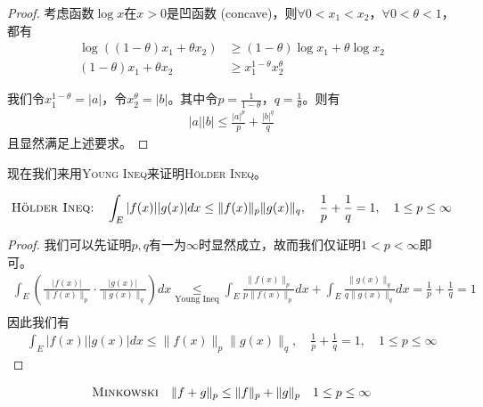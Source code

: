 \begin{proof}
    考虑函数$\log x$在$x>0$是凹函数 (concave)，则$\forall 0<x_1<x_2$，$\forall 0<\theta<1$，都有
    \begin{align*}
        \log\left( (1-\theta)x_1 + \theta x_2\right) &\ge (1-\theta) \log x_1 + \theta \log x_2\\
        (1-\theta)x_1 + \theta x_2 &\ge x_1^{1-\theta} x_2^{\theta} 
    \end{align*}

    我们令$x_1^{1-\theta} = |a|$，令$x_2^{\theta} = |b|$。其中令$p=\frac{1}{1-\theta}$，$q = \frac{1}{\theta}$。则有
    \begin{align*}
        |a||b|\le \frac{|a|^p}{p} + \frac{|b|^q}{q}
    \end{align*}
    且显然满足上述要求。
\end{proof}

现在我们来用\textsc{Young Ineq}来证明\textsc{Hölder Ineq}。
\begin{theorem}
    \begin{align*}
        \textsc{Hölder Ineq:}\quad \int_E |f(x)| |g(x)| dx\le \|f(x)\|_p\|g(x)\|_q, \quad \frac{1}{p} + \frac{1}{q} = 1, \quad 1\le p \le \infty
    \end{align*}
\end{theorem}

\begin{proof}
    我们可以先证明$p, q$有一为$\infty$时显然成立，故而我们仅证明$1 < p < \infty$即可。
    \begin{align*}
        \int_{E} \left(\frac{|f(x)|}{\|f(x)\|_p}\cdot \frac{|g(x)|}{\|g(x)\|_q} \right)dx \underset{\text{Young Ineq}}{\le} \int_E \frac{\|f(x)\|_p}{p\|f(x)\|_p} dx + \int_E \frac{\|g(x)\|_q}{q\|g(x)\|_q}dx = \frac{1}{p} + \frac{1}{q} = 1\\
    \end{align*}
    因此我们有
    \begin{align*}
        \int_E |f(x)| |g(x)| dx\le \|f(x)\|_p\|g(x)\|_q, \quad \frac{1}{p} + \frac{1}{q} = 1, \quad 1\le p \le \infty
    \end{align*}
\end{proof}

\begin{theorem}
    \begin{align*}
        \textsc{Minkowski}\quad \|f+g\|_p \le \|f\|_p + \|g\|_p \quad 1\le p \le \infty
    \end{align*}
\end{theorem}

